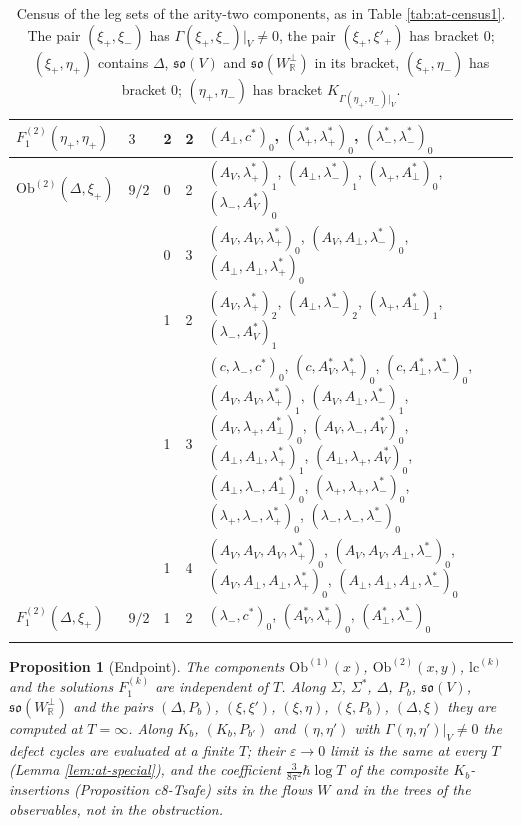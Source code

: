 \documentclass[11pt]{article}
\numberwithin{equation}{section}
\theoremstyle{plain}
\newtheorem{proposition}[theorem]{Proposition}
\theoremstyle{definition}
\newcommand{\Ob}{\mathrm{Ob}}
\newcommand{\lc}{\mathrm{lc}}
\begin{document}
{\begin{longtable}{>{\raggedright}p{2.3cm}|p{0.6cm}|p{0.25cm}|p{0.25cm}|>{\raggedright\arraybackslash}p{11.6cm}}
\hline
$F_1^{(2)}(\eta_+,\eta_+)$ & $3$ & 2 & 2 & $(A_\perp,c^*)_{0}$, $(\lambda^*_+,\lambda^*_+)_{0}$, $(\lambda^*_-,\lambda^*_-)_{0}$ \\
\hline
$\Ob^{(2)}(\Delta,\xi_+)$ & $9/2$ & 0 & 2 & $(A_V,\lambda^*_+)_{1}$, $(A_\perp,\lambda^*_-)_{1}$, $(\lambda_+,A^*_\perp)_{0}$, $(\lambda_-,A^*_V)_{0}$ \\
 &  & 0 & 3 & $(A_V,A_V,\lambda^*_+)_{0}$, $(A_V,A_\perp,\lambda^*_-)_{0}$, $(A_\perp,A_\perp,\lambda^*_+)_{0}$ \\
 &  & 1 & 2 & $(A_V,\lambda^*_+)_{2}$, $(A_\perp,\lambda^*_-)_{2}$, $(\lambda_+,A^*_\perp)_{1}$, $(\lambda_-,A^*_V)_{1}$ \\
 &  & 1 & 3 & $(c,\lambda_-,c^*)_{0}$, $(c,A^*_V,\lambda^*_+)_{0}$, $(c,A^*_\perp,\lambda^*_-)_{0}$, $(A_V,A_V,\lambda^*_+)_{1}$, $(A_V,A_\perp,\lambda^*_-)_{1}$, $(A_V,\lambda_+,A^*_\perp)_{0}$, $(A_V,\lambda_-,A^*_V)_{0}$, $(A_\perp,A_\perp,\lambda^*_+)_{1}$, $(A_\perp,\lambda_+,A^*_V)_{0}$, $(A_\perp,\lambda_-,A^*_\perp)_{0}$, $(\lambda_+,\lambda_+,\lambda^*_-)_{0}$, $(\lambda_+,\lambda_-,\lambda^*_+)_{0}$, $(\lambda_-,\lambda_-,\lambda^*_-)_{0}$ \\
 &  & 1 & 4 & $(A_V,A_V,A_V,\lambda^*_+)_{0}$, $(A_V,A_V,A_\perp,\lambda^*_-)_{0}$, $(A_V,A_\perp,A_\perp,\lambda^*_+)_{0}$, $(A_\perp,A_\perp,A_\perp,\lambda^*_-)_{0}$ \\
\hline
$F_1^{(2)}(\Delta,\xi_+)$ & $9/2$ & 1 & 2 & $(\lambda_-,c^*)_{0}$, $(A^*_V,\lambda^*_+)_{0}$, $(A^*_\perp,\lambda^*_-)_{0}$ \\
\hline

\caption{Census of the leg sets of the arity-two components, as in Table \ref{tab:at-census1}. The pair $(\xi_+,\xi_-)$ has $\Gamma(\xi_+,\xi_-)|_V\neq0$, the pair $(\xi_+,\xi'_+)$ has bracket $0$; $(\xi_+,\eta_+)$ contains $\Delta$, $\mathfrak{so}(V)$ and $\mathfrak{so}(W^\perp_{\mathbb R})$ in its bracket, $(\xi_+,\eta_-)$ has bracket $0$; $(\eta_+,\eta_-)$ has bracket $K_{\Gamma(\eta_+,\eta_-)|_V}$.}
\label{tab:at-census2}
\end{longtable}
}

\begin{proposition}[Endpoint]
\label{prop:at-T}
The components $\Ob^{(1)}(x)$, $\Ob^{(2)}(x,y)$, $\lc^{(k)}$ and the solutions $F_1^{(k)}$ are independent of $T$. Along $\Sigma$, $\Sigma^*$, $\Delta$, $P_b$, $\mathfrak{so}(V)$, $\mathfrak{so}(W^\perp_{\mathbb R})$ and the pairs $(\Delta,P_b)$, $(\xi,\xi')$, $(\xi,\eta)$, $(\xi,P_b)$, $(\Delta,\xi)$ they are computed at $T=\infty$. Along $K_b$, $(K_b,P_{b'})$ and $(\eta,\eta')$ with $\Gamma(\eta,\eta')|_V\neq0$ the defect cycles are evaluated at a finite $T$; their $\varepsilon\to0$ limit is the same at every $T$ (Lemma \ref{lem:at-special}), and the coefficient $\tfrac3{8\pi^2}\hbar\log T$ of the composite $K_b$-insertions (Proposition c8-Tsafe) sits in the flows $W$ and in the trees of the observables, not in the obstruction.
\end{proposition}
\end{document}
